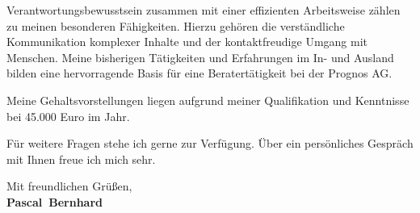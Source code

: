 \documentclass[11pt,a4paper]{article}
\def\firstname{Pascal}
\def\familyname{Bernhard}
\begin{document}
Verantwortungsbewusstsein zusammen mit einer effizienten Arbeitsweise zählen zu meinen besonderen Fähigkeiten. Hierzu gehören die verständliche Kommunikation komplexer Inhalte und der kontaktfreudige Umgang mit Menschen. Meine bisherigen Tätigkeiten und Erfahrungen im In- und Ausland bilden eine hervorragende Basis für eine Beratertätigkeit bei der Prognos AG.

Meine Gehaltsvorstellungen liegen aufgrund meiner Qualifikation und Kenntnisse bei 45.000 Euro im Jahr.


Für weitere Fragen stehe ich gerne zur Verfügung. Über ein persönliches Gespräch mit Ihnen freue ich mich sehr.

  
Mit freundlichen Grüßen,\\[3em] %
%
{\bfseries \firstname~\familyname}\\
%
\end{document}
